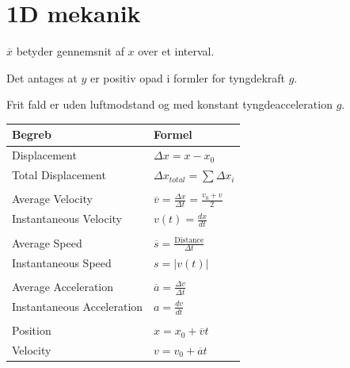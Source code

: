 \section{1D mekanik}

$\overline{x}$ betyder gennemsnit af $x$ over et interval.

Det antages at $y$ er positiv opad i formler for tyngdekraft $g$.

Frit fald er uden luftmodstand og med konstant tyngdeacceleration $g$.

\begin{table}[h]
    \begin{minipage}
        {0.65\textwidth}
        \centering
        \renewcommand{\arraystretch}{1.2} %
        \begin{tabular}{l|l}

            \textbf{Begreb} & \textbf{Formel} \\ \hline
            Displacement & $\Delta x = x-x_0$ \\
            Total Displacement & $\Delta x_{total} = \sum \Delta x_i$ \\
            \\
            Average Velocity & $\overline{v} = \frac{\Delta x}{\Delta t} = \frac{v_0 + v}{2}$ \\
            Instantaneous Velocity & $v(t) = \frac{dx}{dt}$ \\
            \\
            Average Speed & $\overline{s} = \frac{\text{Distance}}{\Delta t}$ \\
            Instantaneous Speed & $s = |v(t)|$ \\
            \\
            Average Acceleration & $\overline{a} = \frac{\Delta v}{\Delta t}$ \\
            Instantaneous Acceleration & $a = \frac{dv}{dt}$ \\
            \\
            Position & $x = x_0 + \overline{v} t$ \\
            Velocity & $v = v_0 + \overline{a} t$ \\
        \end{tabular}
    \end{minipage}
    \hfill
    \begin{minipage}
        {0.3\textwidth}
        \centering


\end{minipage}
\end{table}
